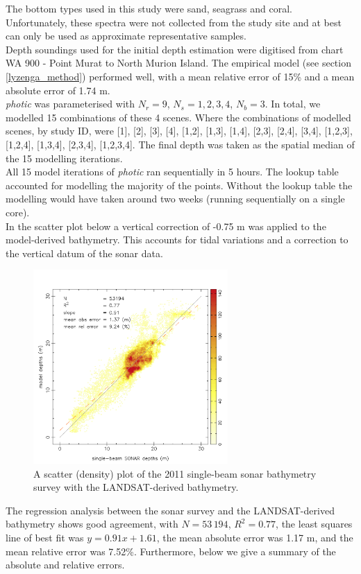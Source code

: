 \documentclass[12pt]{article}
\numberwithin{equation}{section}
\begin{document}
The bottom types used in this study were sand, seagrass and coral. Unfortunately, these 
spectra were not collected from the study site and at best can only be used as 
approximate representative samples. \\ 

Depth soundings used for the initial depth estimation were digitised from chart WA 900 - Point 
Murat to North Murion Island. The empirical model (see section \ref{lyzenga_method}) performed 
well, with a mean relative error of 15\% and a mean absolute error of 1.74 m. \\

\textit{photic} was parameterised with $N_r = 9$, $N_s = 1, 2, 3, 4$, $N_b = 3$. In total, 
we modelled 15 combinations of these 4 scenes. Where the combinations of modelled scenes, 
by study ID, were [1], [2], [3], [4], [1,2], [1,3], [1,4], [2,3], [2,4], [3,4], 
[1,2,3], [1,2,4], [1,3,4], [2,3,4], [1,2,3,4]. The final depth was taken as the spatial 
median of the 15 modelling iterations. \\

All 15 model iterations of \textit{photic} ran sequentially in 5 hours. The lookup table 
accounted for modelling the majority of the points. Without the lookup table the modelling 
would have taken around two weeks (running sequentially on a single core). \\

In the scatter plot below a vertical correction of -0.75 m was applied to the 
model-derived bathymetry. This accounts for tidal variations and a correction to the 
vertical datum of the sonar data. 
\begin{figure}[H]
\centering
\includegraphics[width=0.66\textwidth]{validation_H.png}
\caption{A scatter (density) plot of the 2011 single-beam sonar bathymetry survey 
with the LANDSAT-derived bathymetry.}
\end{figure}
The regression analysis between the sonar survey and the LANDSAT-derived bathymetry 
shows good agreement, with $N = 53\,194$, $R^2 = 0.77$, the least squares line of 
best fit was $y = 0.91 x + 1.61$, the mean absolute error was 1.17 m, 
and the mean relative error was 7.52\%. Furthermore, below we give a summary of the 
absolute and relative errors. 
\end{document}
